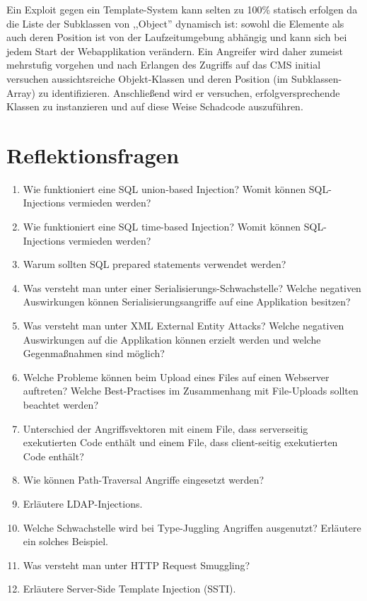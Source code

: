 Ein Exploit gegen ein Template-System kann selten zu 100\% statisch erfolgen da die Liste der Subklassen von ,,Object'' dynamisch ist: sowohl die Elemente als auch deren Position ist von der Laufzeitumgebung abhängig und kann sich bei jedem Start der Webapplikation verändern. Ein Angreifer wird daher zumeist mehrstufig vorgehen und nach Erlangen des Zugriffs auf das CMS initial versuchen aussichtsreiche Objekt-Klassen und deren Position (im Subklassen-Array) zu identifizieren. Anschließend wird er versuchen, erfolgversprechende Klassen zu instanzieren und auf diese Weise Schadcode auszuführen.

\section{Reflektionsfragen}

\begin{enumerate}
	\item Wie funktioniert eine SQL union-based Injection? Womit können SQL-Injections vermieden werden?
	\item Wie funktioniert eine SQL time-based Injection? Womit können SQL-Injections vermieden werden?
	\item Warum sollten SQL prepared statements verwendet werden?
	\item Was versteht man unter einer Serialisierungs-Schwachstelle? Welche negativen Auswirkungen können Serialisierungsangriffe auf eine Applikation besitzen?
	\item Was versteht man unter XML External Entity Attacks? Welche negativen Auswirkungen auf die Applikation können erzielt werden und welche Gegenmaßnahmen sind möglich?
	\item Welche Probleme können beim Upload eines Files auf einen Webserver auftreten? Welche Best-Practises im Zusammenhang mit File-Uploads sollten beachtet werden?
	\item Unterschied der Angriffsvektoren mit einem File, dass serverseitig exekutierten Code enthält und einem File, dass client-seitig exekutierten Code enthält?
	\item Wie können Path-Traversal Angriffe eingesetzt werden?
	\item Erläutere LDAP-Injections.
	\item Welche Schwachstelle wird bei Type-Juggling Angriffen ausgenutzt? Erläutere ein solches Beispiel.
	\item Was versteht man unter HTTP Request Smuggling?
	\item Erläutere Server-Side Template Injection (SSTI).
\end{enumerate}
